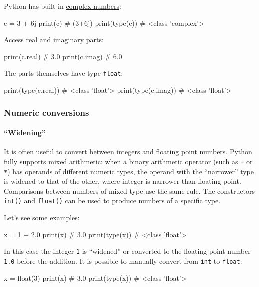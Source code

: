\documentclass[12pt]{article} \newif\ifsolution\solutiontrue %
\begin{document}
Python has built-in
\href{https://docs.python.org/3/library/stdtypes.html\#typesnumeric}{complex
numbers}:

\begin{python}
c = 3 + 6j
print(c)        # (3+6j)
print(type(c))  # <class 'complex'>
\end{python}

Access real and imaginary parts:

\begin{python}
print(c.real)  # 3.0
print(c.imag)  # 6.0
\end{python}

The parts themselves have type \texttt{float}:

\begin{python}
print(type(c.real))  # <class 'float'>
print(type(c.imag))  # <class 'float'>
\end{python}

\subsubsection{Numeric conversions}\label{numeric-conversions}

\paragraph{``Widening''}
It is often useful to convert between integers and floating point
numbers. Python fully supports mixed arithmetic: when a binary
arithmetic operator (such as \texttt{+} or \texttt{*}) has operands of
different numeric types, the operand with the ``narrower'' type is
widened to that of the other, where integer is narrower than floating
point. Comparisons between numbers of mixed type use the same rule. The
constructors \texttt{int()} and \texttt{float()} can be used to produce
numbers of a specific type.

Let's see some examples:

\begin{python}
x = 1 + 2.0
print(x)        # 3.0
print(type(x))  # <class 'float'>
\end{python}

In this case the integer \texttt{1} is ``widened'' or converted to the
floating point number \texttt{1.0} before the addition.
It is possible to manually convert from \texttt{int} to \texttt{float}:

\begin{python}
x = float(3)
print(x)        # 3.0
print(type(x))  # <class 'float'>
\end{python}
\end{document}
